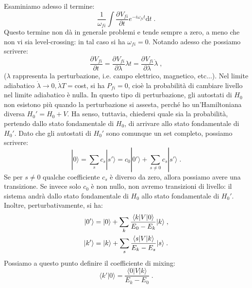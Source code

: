 \documentclass[10pt,a4paper]{report}
\theoremstyle{definition}
\newcommand{\pdev}[3][]{\frac{\partial^{#1} #2}{\partial #3^{#1}}}
\numberwithin{equation}{section}
\newcommand{\diff}[1][]{\mathrm{d}#1}
\newcommand{\bra}{\langle}
\newcommand{\ket}{\rangle}
\begin{document}
Esaminiamo adesso il termine:
\begin{equation}
\frac{1}{\omega_{fi}}\int \pdev{V_{fi}}{t}e^{-i\omega_{fi}t}\diff{t}\;.
\end{equation}
Questo termine non dà in generale problemi e tende sempre a zero, a meno che non vi sia level-crossing: in tal caso si ha $\omega_{fi}=0$. Notando adesso che possiamo scrivere:
\begin{equation}
\pdev{V_{fi}}{t}=\pdev{V_{fi}}{\lambda}{\lambda}{t}=\pdev{V_{fi}}{\lambda}\dot{\lambda}\;,
\end{equation}
($\lambda$ rappresenta la perturbazione, i.e. campo elettrico, magnetico, etc...). Nel limite adiabatico $\dot{\lambda}\to 0,\dot{\lambda}T=$cost, si ha $P_{fi}=0$, cioè la probabilità di cambiare livello nel limite adiabatico è nulla. In questo tipo di perturbazione, gli autostati di $H_0$ non esistono più quando la perturbazione si assesta, perché ho un'Hamiltoniana diversa $H_0'=H_0+V$. Ha senso, tuttavia, chiedersi quale sia la probabilità, pertendo dallo stato fondamentale di $H_0$, di arrivare allo stato fondamentale di $H_0'$. Dato che gli autostati di $H_0'$ sono comunque un set completo, possiamo scrivere:
\begin{equation}
|0\ket=\sum_s c_s|s'\ket=c_0|0'\ket+\sum_{s\ne 0} c_s|s'\ket\;.
\end{equation}
Se per $s\ne 0$ qualche coefficiente $c_s$ è diverso da zero, allora possiamo avere una transizione. Se invece solo $c_0$ è non nullo, non avremo transizioni di livello: il sistema andrà dallo stato fondamentale di $H_0$ allo stato fondamentale di $H_0'$. Inoltre, perturbativamente, si ha:
\begin{align}
|0'\ket &=|0\ket+\sum_k \frac{\bra k|V|0\ket}{E_0-E_k}|k\ket\;, \notag \\
|k'\ket &=|k\ket+\sum_s \frac{\bra s|V|k\ket}{E_k-E_s}|s\ket\;.
\end{align}
Possiamo a questo punto definire il coefficiente di mixing:
\begin{equation}
\bra k'|0\ket=\frac{\bra 0|V|k\ket}{E_k-E_0}\;.
\end{equation}
\end{document}
